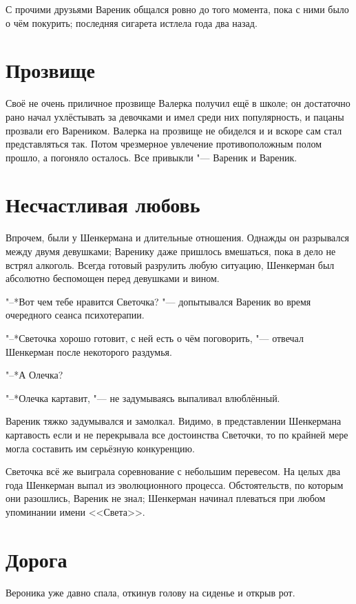 С прочими друзьями Вареник общался ровно до того момента, пока с ними было о чём покурить;
последняя сигарета истлела года два назад. 

\section{Прозвище}

Своё не очень приличное прозвище Валерка получил ещё в школе;
он достаточно рано начал ухлёстывать за девочками и имел среди них популярность, и пацаны прозвали его Вареником.
Валерка на прозвище не обиделся и и вскоре сам стал представляться так.
Потом чрезмерное увлечение противоположным полом прошло, а погоняло осталось.
Все привыкли "--- Вареник и Вареник.

\section{Несчастливая любовь}

Впрочем, были у Шенкермана и длительные отношения.
Однажды он разрывался между двумя девушками;
Варенику даже пришлось вмешаться, пока в дело не встрял алкоголь.
Всегда готовый разрулить любую ситуацию, Шенкерман был абсолютно беспомощен перед девушками и вином.

"--*Вот чем тебе нравится Светочка? "--- допытывался Вареник во время очередного сеанса психотерапии.

"--*Светочка хорошо готовит, с ней есть о чём поговорить, "--- отвечал Шенкерман после некоторого раздумья.

"--*А Олечка?

"--*Олечка картавит, "--- не задумываясь выпаливал влюблённый.

Вареник тяжко задумывался и замолкал.
Видимо, в представлении Шенкермана картавость если и не перекрывала все достоинства Светочки, то по крайней мере могла составить им серьёзную конкуренцию.

Светочка всё же выиграла соревнование с небольшим перевесом.
На целых два года Шенкерман выпал из эволюционного процесса.
Обстоятельств, по которым они разошлись, Вареник не знал;
Шенкерман начинал плеваться при любом упоминании имени <<Света>>.

\section{Дорога}

Вероника уже давно спала, откинув голову на сиденье и открыв рот.

